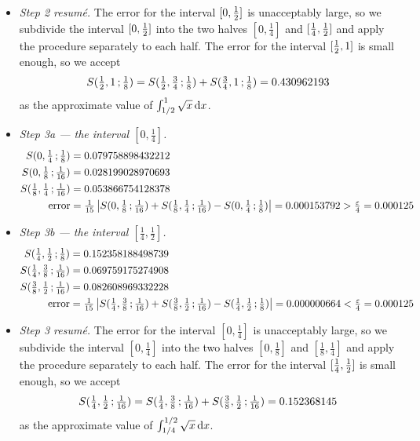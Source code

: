 {\begin{itemize}
\item\emph{Step 2 resum\'e.} The error for the interval $[0,\tfrac{1}{2}]$ is
unacceptably large, so we subdivide the interval $[0,\tfrac{1}{2}]$ into
the two halves $[0,\tfrac{1}{4}]$ and $[\tfrac{1}{4},\tfrac{1}{2}]$
and apply the procedure separately to each half. The error for the interval
$[\tfrac{1}{2},1]$ is small enough, so we accept
\begin{equation*}
S(\tfrac{1}{2},1\,;\tfrac{1}{8})
  = S(\tfrac{1}{2},\tfrac{3}{4}\,;\tfrac{1}{8})
   + S(\tfrac{3}{4},1\,;\tfrac{1}{8})
  = 0.430962193
\end{equation*}
as the approximate value of $\int_{1/2}^1\sqrt{x}\,\mathrm{d}x$.


\item \emph{Step 3a --- the interval $[0,\tfrac{1}{4}]$.}
\begin{align*}
S(0,\tfrac{1}{4}\,;\tfrac{1}{8})&= 0.079758898432212  \\
S(0,\tfrac{1}{8}\,;\tfrac{1}{16})&= 0.028199028970693  \\
S(\tfrac{1}{8},\tfrac{1}{4}\,;\tfrac{1}{16})&= 0.053866754128378  \\
\text{error}&=\tfrac{1}{15}\left|S(0,\tfrac{1}{8}\,;\tfrac{1}{16})
                              +S(\tfrac{1}{8},\tfrac{1}{4}\,;\tfrac{1}{16})
                              -S(0,\tfrac{1}{4}\,;\tfrac{1}{8})\right|
             = 0.000153792 > \tfrac{\varepsilon}{4} = 0.000125
\end{align*}


\item \emph{Step 3b --- the interval $[\tfrac{1}{4},\tfrac{1}{2}]$.}
\begin{align*}
S(\tfrac{1}{4},\tfrac{1}{2}\,;\tfrac{1}{8})&= 0.152358188498739  \\
S(\tfrac{1}{4},\tfrac{3}{8}\,;\tfrac{1}{16})&= 0.069759175274908  \\
S(\tfrac{3}{8},\tfrac{1}{2}\,;\tfrac{1}{16})&= 0.082608969332228  \\
\text{error}&=\tfrac{1}{15}\left|S(\tfrac{1}{4},\tfrac{3}{8}\,;\tfrac{1}{16})
                              +S(\tfrac{3}{8},\tfrac{1}{2}\,;\tfrac{1}{16})
                              -S(\tfrac{1}{4},\tfrac{1}{2}\,;\tfrac{1}{8})\right|
             =  0.000000664  <\tfrac{\varepsilon}{4} = 0.000125
\end{align*}

\item\emph{Step 3 resum\'e.} The error for the interval $[0,\tfrac{1}{4}]$ is
unacceptably large, so we subdivide the interval $[0,\tfrac{1}{4}]$ into
the two halves $[0,\tfrac{1}{8}]$ and $[\tfrac{1}{8},\tfrac{1}{4}]$
and apply the procedure separately to each half. The error for the interval
$[\tfrac{1}{4},\tfrac{1}{2}]$ is small enough, so we accept
\begin{equation*}
S(\tfrac{1}{4},\tfrac{1}{2}\,;\tfrac{1}{16})
  = S(\tfrac{1}{4},\tfrac{3}{8}\,;\tfrac{1}{16})
   + S(\tfrac{3}{8},\tfrac{1}{2}\,;\tfrac{1}{16})
  = 0.152368145
\end{equation*}
as the approximate value of $\int_{1/4}^{1/2}\sqrt{x}\,\mathrm{d}x$.


\end{itemize}}
